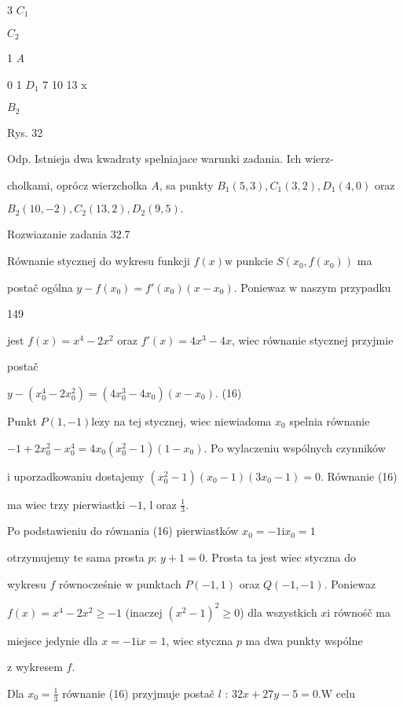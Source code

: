 \documentclass[a4paper,12pt]{article}
\begin{document}
3  $C_{1}$

$C_{2}$

1  {\it A}

0 1  $D_{1}$  7  10  13 x

$B_{2}$

Rys. 32

Odp. Istnieja dwa kwadraty spelniajace warunki zadania. Ich wierz-

cholkami, oprócz wierzcholka $A$, sa punkty $B_{1}(5,3), C_{1}(3,2), D_{1}(4,0)$ oraz

$B_{2}(10,-2), C_{2}(13,2), D_{2}(9,5).$

Rozwiazanie zadania 32.7

Równanie stycznej do wykresu funkcji $f(x)\mathrm{w}$ punkcie $S(x_{0},f(x_{0}))$ ma

postač ogólna $y-f(x_{0}) =f'(x_{0})(x-x_{0})$. Poniewaz $\mathrm{w}$ naszym przypadku





149

jest $f(x)=x^{4}-2x^{2}$ oraz $f'(x)=4x^{3}-4x$, wiec równanie stycznej przyjmie

postač

$y-(x_{0}^{4}-2x_{0}^{2})=(4x_{0}^{3}-4x_{0})(x-x_{0})$.   (16)

Punkt $P(1,-1)\mathrm{l}\mathrm{e}\dot{\mathrm{z}}\mathrm{y}$ na tej stycznej, wiec niewiadoma $x_{0}$ spelnia równanie

$-1+2x_{0}^{2}-x_{0}^{4}=4x_{0}(x_{0}^{2}-1)(1-x_{0})$. Po wylaczeniu wspólnych czynników

$\mathrm{i}$ uporzadkowaniu dostajemy $(x_{0}^{2}-1)(x_{0}-1)(3x_{0}-1)=0$. Równanie (16)

ma wiec trzy pierwiastki $-1$, l oraz $\displaystyle \frac{1}{3}.$

Po podstawieniu do równania (16) pierwiastków $x_{0} = -1 \mathrm{i} x_{0} = 1$

otrzymujemy $\mathrm{t}\mathrm{e}$ sama prosta $p$: $y+1=0$. Prosta ta jest wiec styczna do

wykresu $f$ równocześnie $\mathrm{w}$ punktach $P(-1,1)$ oraz $Q(-1,-1)$. Poniewaz

$f(x)=x^{4}-2x^{2}\geq-1$ (inaczej $(x^{2}-1)^{2}\geq 0$) dla wszystkich $x\mathrm{i}$ równośč ma

miejsce jedynie dla $x=-1\mathrm{i}x=1$, wiec styczna $p$ ma dwa punkty wspólne

$\mathrm{z}$ wykresem $f.$

Dla $x_{0}=\displaystyle \frac{1}{3}$ równanie (16) przyjmuje postač $l$ : $32x+27y-5=0. \mathrm{W}$ celu
\end{document}
